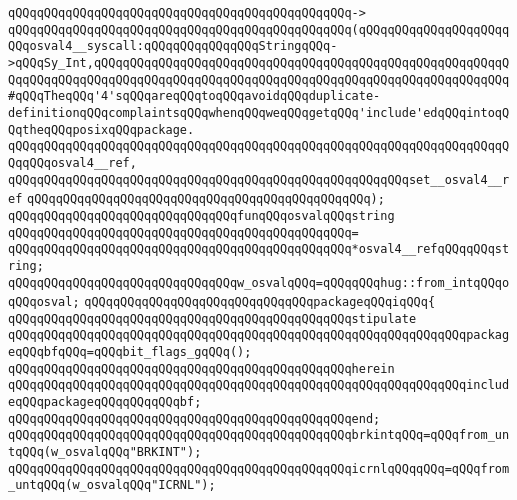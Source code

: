 \verb|qQQqqQQqqQQqqQQqqQQqqQQqqQQqqQQqqQQqqQQqqQQqqQQq->|\newline
\verb|qQQqqQQqqQQqqQQqqQQqqQQqqQQqqQQqqQQqqQQqqQQqqQQq(qQQqqQQqqQQqqQQqqQQqqQQqosval4__syscall:qQQqqQQqqQQqqQQqStringqQQq->qQQqSy_Int,qQQqqQQqqQQqqQQqqQQqqQQqqQQqqQQqqQQqqQQqqQQqqQQqqQQqqQQqqQQqqQQqqQQqqQQqqQQqqQQqqQQqqQQqqQQqqQQqqQQqqQQqqQQqqQQqqQQqqQQqqQQqqQQq#qQQqTheqQQq'4'sqQQqareqQQqtoqQQqavoidqQQqduplicate-definitionqQQqcomplaintsqQQqwhenqQQqweqQQqgetqQQq'include'edqQQqintoqQQqtheqQQqposixqQQqpackage.|\newline
\verb|qQQqqQQqqQQqqQQqqQQqqQQqqQQqqQQqqQQqqQQqqQQqqQQqqQQqqQQqqQQqqQQqqQQqqQQqqQQqosval4__ref,|\newline
\verb|qQQqqQQqqQQqqQQqqQQqqQQqqQQqqQQqqQQqqQQqqQQqqQQqqQQqqQQqset__osval4__ref|\newline
\verb|qQQqqQQqqQQqqQQqqQQqqQQqqQQqqQQqqQQqqQQqqQQqqQQq);|\newline
\newline
\verb|qQQqqQQqqQQqqQQqqQQqqQQqqQQqqQQqfunqQQqosvalqQQqstring|\newline
\verb|qQQqqQQqqQQqqQQqqQQqqQQqqQQqqQQqqQQqqQQqqQQqqQQq=|\newline
\verb|qQQqqQQqqQQqqQQqqQQqqQQqqQQqqQQqqQQqqQQqqQQqqQQq*osval4__refqQQqqQQqstring;|\newline
\newline
\verb|qQQqqQQqqQQqqQQqqQQqqQQqqQQqqQQqw_osvalqQQq=qQQqqQQqhug::from_intqQQqoqQQqosval;|\newline
\newline
\verb|qQQqqQQqqQQqqQQqqQQqqQQqqQQqqQQqpackageqQQqiqQQq{|\newline
\newline
\verb|qQQqqQQqqQQqqQQqqQQqqQQqqQQqqQQqqQQqqQQqqQQqqQQqstipulate|\newline
\verb|qQQqqQQqqQQqqQQqqQQqqQQqqQQqqQQqqQQqqQQqqQQqqQQqqQQqqQQqqQQqqQQqpackageqQQqbfqQQq=qQQqbit_flags_gqQQq();|\newline
\verb|qQQqqQQqqQQqqQQqqQQqqQQqqQQqqQQqqQQqqQQqqQQqqQQqherein|\newline
\verb|qQQqqQQqqQQqqQQqqQQqqQQqqQQqqQQqqQQqqQQqqQQqqQQqqQQqqQQqqQQqqQQqincludeqQQqpackageqQQqqQQqqQQqbf;|\newline
\verb|qQQqqQQqqQQqqQQqqQQqqQQqqQQqqQQqqQQqqQQqqQQqqQQqend;|\newline
\newline
\verb|qQQqqQQqqQQqqQQqqQQqqQQqqQQqqQQqqQQqqQQqqQQqqQQqbrkintqQQq=qQQqfrom_untqQQq(w_osvalqQQq"BRKINT");|\newline
\verb|qQQqqQQqqQQqqQQqqQQqqQQqqQQqqQQqqQQqqQQqqQQqqQQqicrnlqQQqqQQq=qQQqfrom_untqQQq(w_osvalqQQq"ICRNL");|\newline
